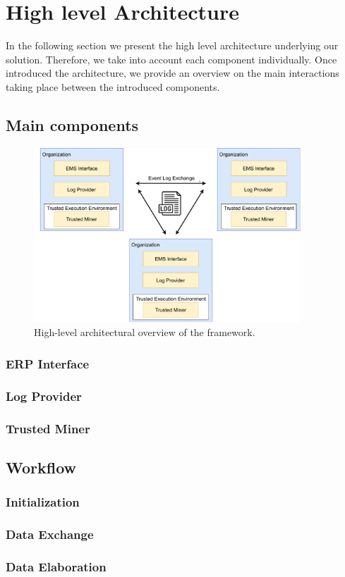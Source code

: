 \section{High level Architecture}
In the following section we present the high level architecture underlying our solution. Therefore, we take into account each component individually. Once introduced the architecture, we provide an overview on the main interactions taking place between the introduced components.
\subsection{Main components}
\label{sec:architecture_diagram}
\begin{figure}[t]
\centering
\includegraphics[width=10cm]{content/figures/architecture_diagram.pdf}
\caption{High-level architectural overview of the framework.}
\label{fig:implementation}
\end{figure}
\subsubsection{ERP Interface}
\subsubsection{Log Provider}
\subsubsection{Trusted Miner}
\subsection{Workflow}
\subsubsection{Initialization}
\subsubsection{Data Exchange}
\subsubsection{Data Elaboration}



